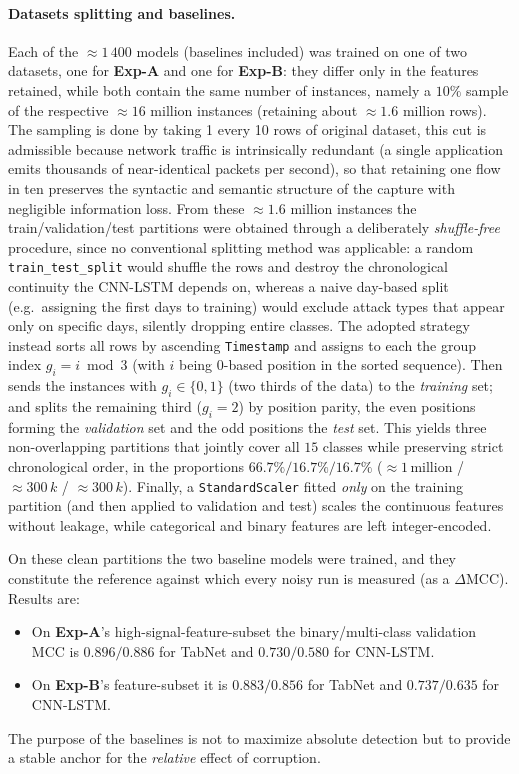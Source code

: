 \documentclass[a4paper, 9pt]{extarticle}
\begin{document}
\paragraph{Datasets splitting and baselines.}
Each of the $\approx1\,400$ models (baselines included) was trained on one of two datasets, one for \textbf{Exp-A} and one for \textbf{Exp-B}: they differ only in the features retained, while both contain the same number of instances, namely a $10\%$ sample of the respective $\approx16$ million instances (retaining about $\approx1.6$ million rows). The sampling is done by taking 1 every 10 rows of original dataset, this cut is admissible because network traffic is intrinsically redundant (a single application emits thousands of near-identical packets per second), so that retaining one flow in ten preserves the syntactic and semantic structure of the capture with negligible information loss. From these $\approx1.6$ million instances the train/validation/test partitions were obtained through a deliberately \emph{shuffle-free} procedure, since no conventional splitting method was applicable: a random \texttt{train\_test\_split} would shuffle the rows and destroy the chronological continuity the CNN-LSTM depends on, whereas a naive day-based split (e.g.\ assigning the first days to training) would exclude attack types that appear only on specific days, silently dropping entire classes. The adopted strategy instead sorts all rows by ascending \texttt{Timestamp} and assigns to each the group index $g_i = i \bmod 3$ (with $i$ being $0$-based position in the sorted sequence). Then sends the instances with $g_i\in\{0,1\}$ (two thirds of the data) to the \emph{training} set; and splits the remaining third ($g_i = 2$) by position parity, the even positions forming the \emph{validation} set and the odd positions the \emph{test} set. This yields three non-overlapping partitions that jointly cover all $15$ classes while preserving strict chronological order, in the proportions $66.7\%/16.7\%/16.7\%$ ($\approx1\,$million / $\approx300\,k$ / $\approx300\,k$). Finally, a \texttt{StandardScaler} fitted \emph{only} on the training partition (and then applied to validation and test) scales the continuous features without leakage, while categorical and binary features are left integer-encoded.

On these clean partitions the two baseline models were trained, and they constitute the reference against which every noisy run is measured (as a $\Delta\mathrm{MCC}$). Results are:
\begin{itemize}
    \item On \textbf{Exp-A}'s high-signal-feature-subset the binary/multi-class validation MCC is $0.896/0.886$ for TabNet and $0.730/0.580$ for CNN-LSTM.
    \item On \textbf{Exp-B}'s feature-subset it is $0.883/0.856$ for TabNet and $0.737/0.635$ for CNN-LSTM.
\end{itemize}
The purpose of the baselines is not to maximize absolute detection but to provide a stable anchor for the \emph{relative} effect of corruption.
\end{document}
